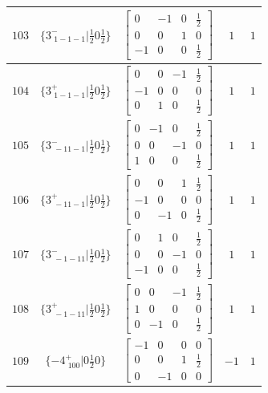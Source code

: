 \documentclass[fleqn,8pt]{jsarticle}
\begin{document}
\begin{longtable}{ccccc}
$ 103 $ & $ \{3^{-}_{\,\,1-1-1}|\frac{1}{2} 0 \frac{1}{2}\} $ & $ \begin{bmatrix} 0 & -1 & 0 & \frac{1}{2} \\ 0 & 0 & 1 & 0 \\ -1 & 0 & 0 & \frac{1}{2} \end{bmatrix} $ & $ 1 $ & $ 1 $ \\ \hline
$ 104 $ & $ \{3^{+}_{\,\,1-1-1}|\frac{1}{2} 0 \frac{1}{2}\} $ & $ \begin{bmatrix} 0 & 0 & -1 & \frac{1}{2} \\ -1 & 0 & 0 & 0 \\ 0 & 1 & 0 & \frac{1}{2} \end{bmatrix} $ & $ 1 $ & $ 1 $ \\ \hline
$ 105 $ & $ \{3^{-}_{\,\,-11-1}|\frac{1}{2} 0 \frac{1}{2}\} $ & $ \begin{bmatrix} 0 & -1 & 0 & \frac{1}{2} \\ 0 & 0 & -1 & 0 \\ 1 & 0 & 0 & \frac{1}{2} \end{bmatrix} $ & $ 1 $ & $ 1 $ \\ \hline
$ 106 $ & $ \{3^{+}_{\,\,-11-1}|\frac{1}{2} 0 \frac{1}{2}\} $ & $ \begin{bmatrix} 0 & 0 & 1 & \frac{1}{2} \\ -1 & 0 & 0 & 0 \\ 0 & -1 & 0 & \frac{1}{2} \end{bmatrix} $ & $ 1 $ & $ 1 $ \\ \hline
$ 107 $ & $ \{3^{-}_{\,\,-1-11}|\frac{1}{2} 0 \frac{1}{2}\} $ & $ \begin{bmatrix} 0 & 1 & 0 & \frac{1}{2} \\ 0 & 0 & -1 & 0 \\ -1 & 0 & 0 & \frac{1}{2} \end{bmatrix} $ & $ 1 $ & $ 1 $ \\ \hline
$ 108 $ & $ \{3^{+}_{\,\,-1-11}|\frac{1}{2} 0 \frac{1}{2}\} $ & $ \begin{bmatrix} 0 & 0 & -1 & \frac{1}{2} \\ 1 & 0 & 0 & 0 \\ 0 & -1 & 0 & \frac{1}{2} \end{bmatrix} $ & $ 1 $ & $ 1 $ \\ \hline
$ 109 $ & $ \{-4^{+}_{\,\,100}|0 \frac{1}{2} 0\} $ & $ \begin{bmatrix} -1 & 0 & 0 & 0 \\ 0 & 0 & 1 & \frac{1}{2} \\ 0 & -1 & 0 & 0 \end{bmatrix} $ & $ -1 $ & $ 1 $ \\ \hline

\end{longtable}
\end{document}
